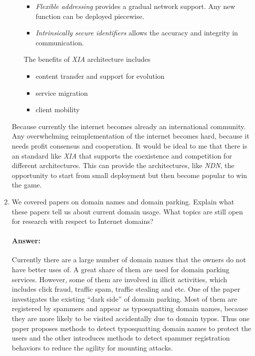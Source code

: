 \documentclass[a4paper,11pt]{article}
\theoremstyle{mytheor}
\begin{document}
\begin{enumerate}
\begin{itemize}
\begin{itemize}
\item \emph{Flexible addressing} provides a gradual network support.
Any new function can be deployed piecewise.
\item \emph{Intrinsically secure identifiers} allows the accuracy and integrity in communication.
\end{itemize}
The benefits of \emph{XIA} architecture includes
\begin{itemize}
	\item content transfer and support for evolution
	\item service migration
	\item client mobility
\end{itemize}
\end{itemize}

Because currently the internet becomes already an international community.
Any overwhelming reimplementation of the internet becomes hard, because it needs profit consensus and cooperation.
It would be ideal to me that there is an standard like \emph{XIA} that supports the coexistence and competition for different architectures.
This can provide the architectures, like \emph{NDN}, the opportunity to start from small deployment but then become popular to win the game.

\item 
We covered papers on domain names and domain parking. 
Explain what these papers tell us about current domain usage. 
What topics are still open for research with respect to Internet domains?
\paragraph{Answer:}
Currently there are a large number of domain names that the owners do not have better uses of.
A great share of them are used for domain parking services.
However, some of them are involved in illicit activities, which includes click fraud, traffic spam, traffic stealing and etc.
One of the paper investigates the existing ``dark side'' of domain parking.
Most of them are registered by spammers and appear as typosquatting domain names, because they are more likely to be visited accidentally due to domain typos.
Thus one paper proposes methods to detect typosquatting domain names to protect the users and the other introduces methods to detect spammer registration behaviors to reduce the agility for mounting attacks.


\end{enumerate}
\end{document}
